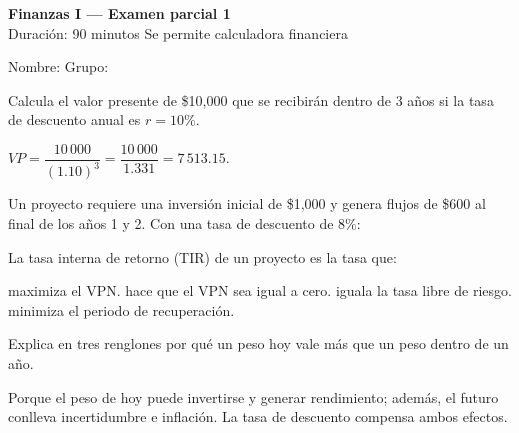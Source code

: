 \documentclass[11pt,addpoints]{exam}
\begin{document}
\begin{center}
{\Large\bfseries Finanzas I --- Examen parcial 1}\\[4pt]
Duración: 90 minutos \quad\textbullet\quad Se permite calculadora financiera
\end{center}

\vspace{6pt}
\noindent Nombre: \makebox[0.55\textwidth]{\hrulefill}\quad Grupo: \makebox[0.15\textwidth]{\hrulefill}

\begin{center}
\gradetable[h][questions]
\end{center}

\begin{questions}

\question[10] Calcula el valor presente de \$10{,}000 que se recibirán dentro de 3 años si la tasa de descuento anual es $r = 10\%$.
\begin{solution}
$VP = \dfrac{10\,000}{(1.10)^3} = \dfrac{10\,000}{1.331} = 7\,513.15$.
\end{solution}

\question Un proyecto requiere una inversión inicial de \$1{,}000 y genera flujos de \$600 al final de los años 1 y 2. Con una tasa de descuento de $8\%$:

\question[5] La tasa interna de retorno (TIR) de un proyecto es la tasa que:
\begin{choices}
  \choice maximiza el VPN.
  \CorrectChoice hace que el VPN sea igual a cero.
  \choice iguala la tasa libre de riesgo.
  \choice minimiza el periodo de recuperación.
\end{choices}

\question[5] Explica en tres renglones por qué un peso hoy vale más que un peso dentro de un año.
\begin{solution}
Porque el peso de hoy puede invertirse y generar rendimiento; además, el futuro conlleva incertidumbre e inflación. La tasa de descuento compensa ambos efectos.
\end{solution}
\makeemptybox{3cm}

\end{questions}
\end{document}
